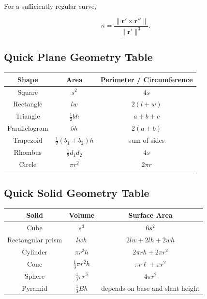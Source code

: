 For a sufficiently regular curve,

\[
\boxed{
\kappa
=
\frac{
\|\mathbf{r}'\times\mathbf{r}''\|
}{
\|\mathbf{r}'\|^3
}.
}
\]

\subsection{Quick Plane Geometry Table}
\label{subsec:quick-plane-geometry-table}

\begin{center}
\begin{tabular}{c|c|c}
\textbf{Shape}
&
\textbf{Area}
&
\textbf{Perimeter / Circumference}
\\ \hline

Square
&
\(s^2\)
&
\(4s\)
\\

Rectangle
&
\(lw\)
&
\(2(l+w)\)
\\

Triangle
&
\(\frac12bh\)
&
\(a+b+c\)
\\

Parallelogram
&
\(bh\)
&
\(2(a+b)\)
\\

Trapezoid
&
\(\frac12(b_1+b_2)h\)
&
sum of sides
\\

Rhombus
&
\(\frac12d_1d_2\)
&
\(4s\)
\\

Circle
&
\(\pi r^2\)
&
\(2\pi r\)
\end{tabular}
\end{center}

\subsection{Quick Solid Geometry Table}
\label{subsec:quick-solid-geometry-table}

\begin{center}
\begin{tabular}{c|c|c}
\textbf{Solid}
&
\textbf{Volume}
&
\textbf{Surface Area}
\\ \hline

Cube
&
\(s^3\)
&
\(6s^2\)
\\

Rectangular prism
&
\(lwh\)
&
\(2lw+2lh+2wh\)
\\

Cylinder
&
\(\pi r^2h\)
&
\(2\pi rh+2\pi r^2\)
\\

Cone
&
\(\frac13\pi r^2h\)
&
\(\pi r\ell+\pi r^2\)
\\

Sphere
&
\(\frac43\pi r^3\)
&
\(4\pi r^2\)
\\

Pyramid
&
\(\frac13Bh\)
&
depends on base and slant height
\end{tabular}
\end{center}

